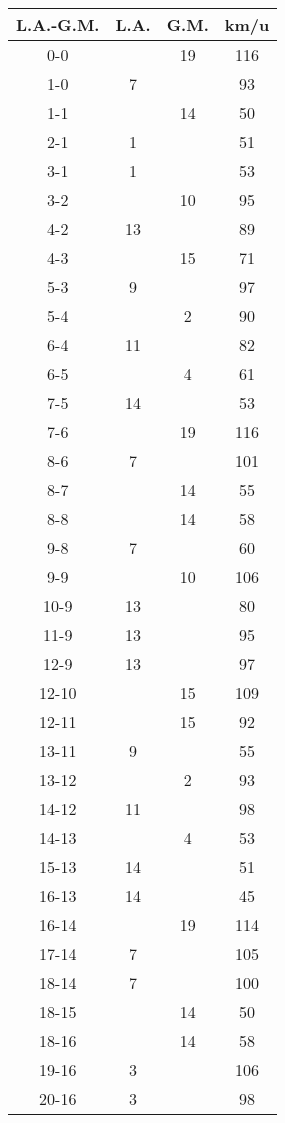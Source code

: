 \begin{table}[h!]
  \centering
  \scriptsize
  \begin{tabular}{|c|c|c|c|} \hline
    L.A.-G.M. & L.A. & G.M. & km/u \\ \hline
    0-0 &  & 19 & 116 \\
    1-0 & 7 & & 93 \\
    1-1 &  & 14 & 50 \\
    2-1 & 1 & & 51 \\
    3-1 & 1 & & 53 \\
    3-2 &  & 10 & 95 \\
    4-2 & 13 & & 89 \\
    4-3 &  & 15 & 71 \\
    5-3 & 9 & & 97 \\
    5-4 &  & 2 & 90 \\
    6-4 & 11 & & 82 \\
    6-5 &  & 4 & 61 \\
    7-5 & 14 & & 53 \\
    7-6 &  & 19 & 116 \\
    8-6 & 7 &  & 101 \\
    8-7 &  & 14 & 55 \\
    8-8 &  & 14 & 58 \\
    9-8 & 7 & & 60 \\
    9-9 &  & 10 & 106 \\
    10-9 & 13 & & 80 \\
    11-9 & 13 & & 95 \\
    12-9 & 13 & & 97 \\
    12-10 &  & 15 & 109 \\
    12-11 &  & 15 & 92 \\
    13-11 & 9 &  & 55 \\
    13-12 &  & 2 & 93 \\
    14-12 & 11 &  & 98 \\
    14-13 &  & 4 & 53 \\
    15-13 & 14 &  & 51 \\
    16-13 & 14 &  & 45 \\
    16-14 &  & 19 & 114 \\
    17-14 & 7 &  & 105 \\
    18-14 & 7 &  & 100 \\
    18-15 &  & 14 & 50 \\
    18-16 &  & 14 & 58 \\
    19-16 & 3 &  & 106 \\
    20-16 & 3 &  & 98 \\

\end{tabular}
\end{table}

